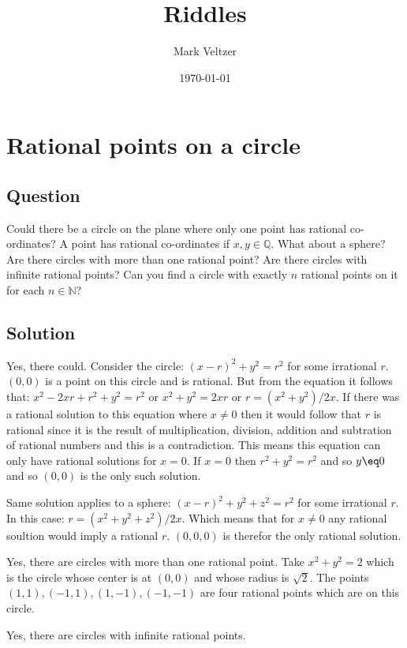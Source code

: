 \documentclass{article}
\title{Riddles}
\author{Mark Veltzer}
\date{\today}
\begin{document}
\maketitle

\section{Rational points on a circle}

\subsection{Question}

Could there be a circle on the plane where only one point has rational co-ordinates? A point has rational co-ordinates if $x,y\in\mathbb{Q}$. What about a sphere? Are there circles with more than one rational point? Are there circles with infinite rational points? Can you find a circle with exactly $n$ rational points on it for each $n\in\mathbb{N}$?

\subsection{Solution}

Yes, there could. Consider the circle: $(x-r)^2+y^2=r^2$ for some irrational $r$.
$(0,0)$ is a point on this circle and is rational. But from the equation it follows
that: $x^2-2xr+r^2+y^2=r^2$ or $x^2+y^2=2xr$ or $r=(x^2+y^2)/2x$. If there
was a rational solution to this equation where $x\ne0$ then it would follow that
$r$ is rational since it is the result of multiplication, division, addition and subtration
of rational numbers and this is a contradiction. This means this equation can only
have rational solutions for $x=0$. If $x=0$ then $r^2+y^2=r^2$ and so $y\eq0$ and so
$(0,0)$ is the only such solution.

Same solution applies to a sphere: $(x-r)^2+y^2+z^2=r^2$ for some irrational $r$.
In this case: $r=(x^2+y^2+z^2)/2x$. Which means that for $x\ne0$ any rational soultion would imply a rational $r$.
$(0,0,0)$ is therefor the only rational solution.

Yes, there are circles with more than one rational point. Take $x^2+y^2=2$ which is the circle whose
center is at $(0,0)$ and whose radius is $\sqrt{2}$. The points $(1,1),(-1,1),(1,-1),(-1,-1)$ are four rational
points which are on this circle.

Yes, there are circles with infinite rational points.
\end{document}

